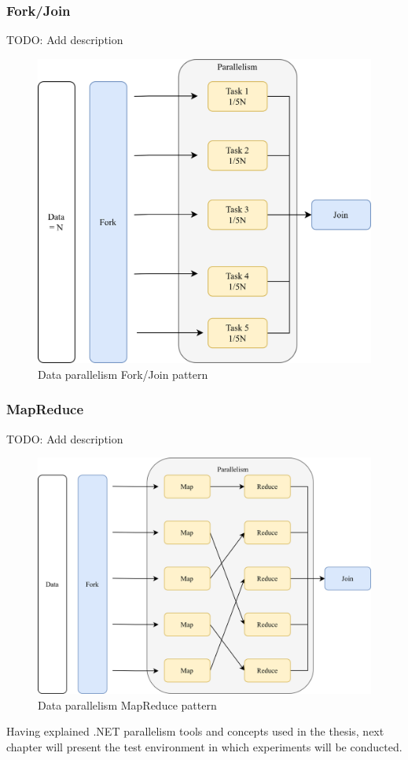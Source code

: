 \subsubsection{Fork/Join}
\label{sec: ForkJoin}
TODO: Add description
\begin{figure}[htb]
	\centering
		\includegraphics[scale=1.0]{figures02/forkjoin.png}
		\caption{Data parallelism Fork/Join pattern}
		\label{fig:ForkJoin}
\end{figure}

\subsubsection{MapReduce}
\label{sec: MapReduce}
TODO: Add description
\begin{figure}[htb]
	\centering
		\includegraphics[scale=1.0]{figures02/mapreduce.png}
		\caption{Data parallelism MapReduce pattern}
		\label{fig:MapReduce}
\end{figure}

Having explained .NET parallelism tools and concepts used in the thesis, next chapter will present the test environment in which experiments will be conducted. 
